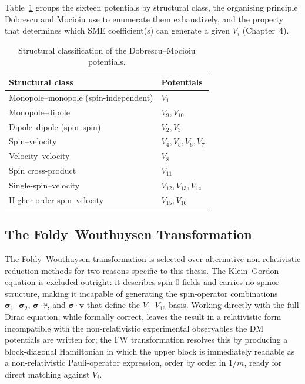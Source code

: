 Table~\ref{tab:dm-classification} groups the sixteen potentials by
structural class, the organising principle Dobrescu and Mocioiu use to
enumerate them exhaustively, and the property that determines which SME
coefficient(s) can generate a given $V_i$ (Chapter~4).

\begin{table}[h]
\centering
\begin{tabular}{@{}ll@{}}
\toprule
Structural class & Potentials \\
\midrule
Monopole--monopole (spin-independent) & $V_1$ \\
Monopole--dipole & $V_9, V_{10}$ \\
Dipole--dipole (spin--spin) & $V_2, V_3$ \\
Spin--velocity & $V_4, V_5, V_6, V_7$ \\
Velocity--velocity & $V_8$ \\
Spin cross-product & $V_{11}$ \\
Single-spin--velocity & $V_{12}, V_{13}, V_{14}$ \\
Higher-order spin--velocity & $V_{15}, V_{16}$ \\
\bottomrule
\end{tabular}
\caption{Structural classification of the Dobrescu--Mocioiu potentials.}
\label{tab:dm-classification}
\end{table}

\subsection{The Foldy--Wouthuysen Transformation}
\label{sec:fw}

The Foldy--Wouthuysen transformation is selected over alternative
non-relativistic reduction methods for two reasons specific to this thesis.
The Klein--Gordon equation is excluded outright: it describes spin-0 fields
and carries no spinor structure, making it incapable of generating the
spin-operator combinations $\bm\sigma_1\cdot\bm\sigma_2$,
$\bm\sigma\cdot\hat r$, and $\bm\sigma\cdot\mathbf v$ that define the
$V_1$--$V_{16}$ basis. Working directly with the full Dirac equation, while
formally correct, leaves the result in a relativistic form incompatible
with the non-relativistic experimental observables the DM potentials are
written for; the FW transformation resolves this by producing a
block-diagonal Hamiltonian in which the upper block is immediately readable
as a non-relativistic Pauli-operator expression, order by order in $1/m$,
ready for direct matching against $V_i$.

